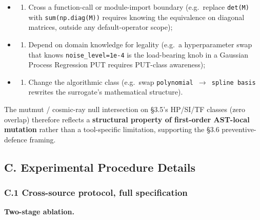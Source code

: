 \documentclass[review,12pt,authoryear]{elsarticle}
\providecommand{\tightlist}{\setlength{\itemsep}{0pt}\setlength{\parskip}{0pt}}
\begin{document}
\begin{itemize}
\tightlist
\item
  \begin{enumerate}
  \def\labelenumi{(\alph{enumi})}
  \tightlist
  \item
    Cross a function-call or module-import boundary (e.g.~replace
    \texttt{det(M)} with \texttt{sum(np.diag(M))} requires knowing the
    equivalence on diagonal matrices, outside any default-operator
    scope);
  \end{enumerate}
\item
  \begin{enumerate}
  \def\labelenumi{(\alph{enumi})}
  \setcounter{enumi}{1}
  \tightlist
  \item
    Depend on domain knowledge for legality (e.g.~a hyperparameter swap
    that knows \texttt{noise\_level=1e-4} is the load-bearing knob in a
    Gaussian Process Regression PUT requires PUT-class awareness);
  \end{enumerate}
\item
  \begin{enumerate}
  \def\labelenumi{(\alph{enumi})}
  \setcounter{enumi}{2}
  \tightlist
  \item
    Change the algorithmic class (e.g.~swap
    \texttt{polynomial\ $\to$\ spline\ basis} rewrites the surrogate's
    mathematical structure).
  \end{enumerate}
\end{itemize}

The mutmut / cosmic-ray null intersection on §3.5's HP/SI/TF classes
(zero overlap) therefore reflects a \textbf{structural property of
first-order AST-local mutation} rather than a tool-specific limitation,
supporting the §3.6 preventive-defence framing.


\subsection{C. Experimental Procedure Details}\label{c.-experimental-procedure-details}

\subsubsection{C.1 Cross-source protocol, full specification}\label{c.1-cross-source-v4-protocol-full-specification}

\textbf{Two-stage ablation.}
\end{document}

